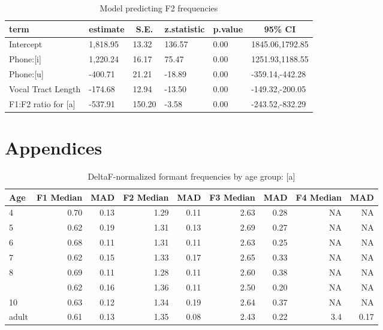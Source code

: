 \documentclass[
]{article}
\begin{document}
\begin{table}[tbp]

\begin{center}
\begin{threeparttable}

\caption{\label{tab:f2-model}Model predicting F2 frequencies}

\begin{tabular}{llllll}
\toprule
term & \multicolumn{1}{c}{estimate} & \multicolumn{1}{c}{S.E.} & \multicolumn{1}{c}{z.statistic} & \multicolumn{1}{c}{p.value} & \multicolumn{1}{c}{95\% CI}\\
\midrule
Intercept & 1,818.95 & 13.32 & 136.57 & 0.00 & 1845.06,1792.85\\
Phone:[i] & 1,220.24 & 16.17 & 75.47 & 0.00 & 1251.93,1188.55\\
Phone:[u] & -400.71 & 21.21 & -18.89 & 0.00 & -359.14,-442.28\\
Vocal Tract Length & -174.68 & 12.94 & -13.50 & 0.00 & -149.32,-200.05\\
F1:F2 ratio for [a] & -537.91 & 150.20 & -3.58 & 0.00 & -243.52,-832.29\\
\bottomrule
\end{tabular}

\end{threeparttable}
\end{center}

\end{table}

\hypertarget{appendices}{%
\section{Appendices}\label{appendices}}

\begin{table}[!h]

\caption{\label{tab:deltaf-measurement-table-a}DeltaF-normalized formant frequencies by age group: [a]}
\centering
\begin{tabular}[t]{lrrrrrrrr}
\toprule
Age & F1 Median & MAD & F2 Median & MAD & F3 Median & MAD & F4 Median & MAD\\
\midrule
4 & 0.70 & 0.13 & 1.29 & 0.11 & 2.63 & 0.28 & NA & NA\\
5 & 0.62 & 0.19 & 1.31 & 0.13 & 2.69 & 0.27 & NA & NA\\
6 & 0.68 & 0.11 & 1.31 & 0.11 & 2.63 & 0.25 & NA & NA\\
7 & 0.62 & 0.15 & 1.33 & 0.17 & 2.65 & 0.33 & NA & NA\\
8 & 0.69 & 0.11 & 1.28 & 0.11 & 2.60 & 0.38 & NA & NA\\
\addlinespace
9 & 0.62 & 0.16 & 1.36 & 0.11 & 2.50 & 0.20 & NA & NA\\
10 & 0.63 & 0.12 & 1.34 & 0.19 & 2.64 & 0.37 & NA & NA\\
adult & 0.61 & 0.13 & 1.35 & 0.08 & 2.43 & 0.22 & 3.4 & 0.17\\
\bottomrule
\end{tabular}
\end{table}
\end{document}

